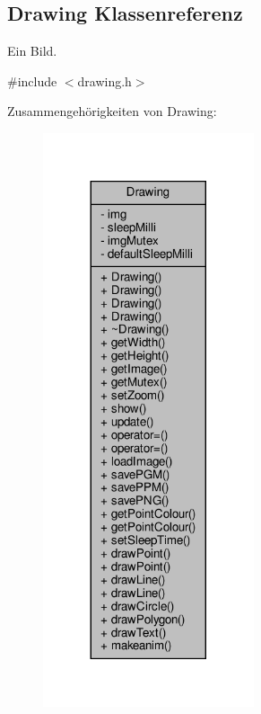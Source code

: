 \hypertarget{classDrawing}{}\subsection{Drawing Klassenreferenz}
\label{classDrawing}


Ein Bild.  




{\ttfamily \#include $<$drawing.\+h$>$}



Zusammengehörigkeiten von Drawing\+:
\nopagebreak
\begin{figure}[H]
\begin{center}
\leavevmode
\includegraphics[width=176pt]{classDrawing__coll__graph}
\end{center}
\end{figure}
